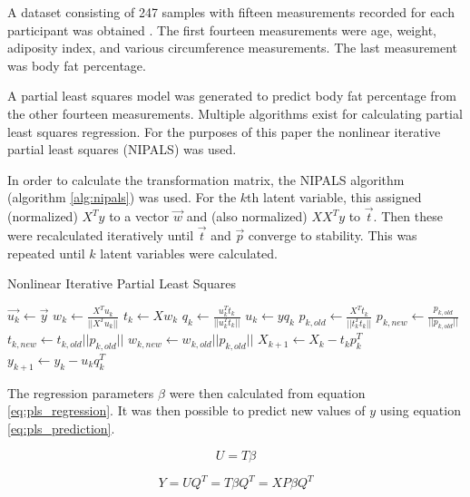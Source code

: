 \documentclass{IEEEtran}
\begin{document}
A dataset consisting of 247 samples with fifteen measurements recorded for each participant was obtained \cite{Penrose1985}. The first fourteen measurements were age, weight, adiposity index, and various circumference measurements. The last measurement was body fat percentage.

A partial least squares model was generated to predict body fat percentage from the other fourteen measurements. Multiple algorithms exist for calculating partial least squares regression\cite{Frank1993}\cite{Dejong1993}. For the purposes of this paper the nonlinear iterative partial least squares (NIPALS) was used\cite{Wold1975}. 

In order to calculate the transformation matrix, the NIPALS algorithm (algorithm \ref{alg:nipals}) was used. For the $k$th latent variable, this assigned (normalized) $X^T y$ to a vector $\vec{w}$ and (also normalized) $X X^T y$ to $\vec{t}$. Then these were recalculated iteratively until $\vec{t}$ and $\vec{p}$ converge to stability. This was repeated until $k$ latent variables were calculated.

\begin{algorithm}
\caption{Nonlinear Iterative Partial Least Squares}\label{alg:nipals}
\begin{algorithmic}[1]
	\State $\vec{u_k} \gets \vec{y}$
	\State $w_k \gets \frac{X^T u_k}{|| X^T u_k ||}$
	\State $t_k \gets X w_k$
	\State $q_k \gets \frac{u_k^T t_k}{|| u_k^T t_k ||}$
	\State $u_k \gets y q_k$
		\State $p_{k, old} \gets \frac{X^T t_k}{|| t_k^T t_k ||}$
		\State $p_{k, new} \gets \frac{p_{k, old}}{|| p_{k, old} ||}$
		\State $t_{k, new} \gets t_{k, old} || p_{k, old} ||$
		\State $w_{k, new} \gets w_{k, old} || p_{k, old} ||$
	\EndWhile
	\State $ X_{k+1} \gets X_k - t_k p_k^T$
	\State $ y_{k+1} \gets y_k - u_k q_k^T $
\EndFor
\EndProcedure
\end{algorithmic}
\end{algorithm}

The regression parameters $\beta$ were then calculated from equation \ref{eq:pls_regression}. It was then possible to predict new values of $y$ using equation \ref{eq:pls_prediction}.

\begin{equation}
U = T \beta
\label{eq:pls_regression}
\end{equation}

\begin{equation}
Y = U Q^T = T \beta Q^T = X P \beta Q^T
\label{eq:pls_prediction}
\end{equation}
\end{document}
